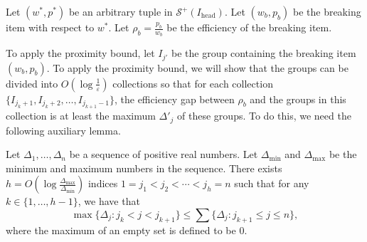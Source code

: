 \documentclass[a4paper,UKenglish,cleveref, autoref, thm-restate, pdfa]{lipics-v2021}
\newcommand{\eps}{\varepsilon}
\renewcommand{\leq}{\leqslant}
\begin{document}
Let $(w^*, p^*)$ be an arbitrary tuple in $\mathcal{S}^+(I_{\mathrm{head}})$. Let $(w_b, p_b)$ be the breaking item with respect to $w^*$. Let $\rho_b = \frac{p_b}{w_b}$ be the efficiency of the breaking item. 

To apply the proximity bound, let $I_{j'}$ be the group containing the breaking item $(w_b, p_b)$. To apply the proximity bound, we will show that the groups can be divided into  $O(\log \frac{1}{\eps})$ collections so that for each collection $\{I_{j_{k} + 1}, I_{j_{k} + 2}, \ldots, I_{j_{k+1}-1} \}$,  the efficiency gap between $\rho_b$ and the groups in this collection is at least the maximum $\Delta'_j$ of these groups. To do this, we need the following auxiliary lemma.

\begin{lemma}\label{lem:cluster}
    Let $\Delta_1, \ldots, \Delta_n$ be a sequence of positive real numbers. Let $\Delta_{\min}$ and $\Delta_{\max}$ be the minimum and maximum numbers in the sequence. There exists $h = O(\log \frac{\Delta_{\max}}{\Delta_{\min}})$ indices $1 = j_1 < j_2 < \cdots < j_h = n$ such that for any $k \in \{1, \ldots, h-1\}$, we have that
    \begin{equation}\label{eq:cluster-original}
            \max\{\Delta_j : j_k < j < j_{k+1}\} \leq \sum\{\Delta_j : j_{k+1} \leq j \leq n\},
    \end{equation}
    where the maximum of an empty set is defined to be $0$.
\end{lemma}
\end{document}
